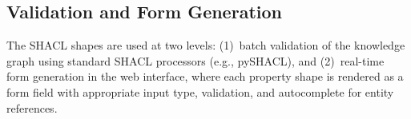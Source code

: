 \subsection{Validation and Form Generation}

The SHACL shapes are used at two levels: (1)~batch validation of the knowledge
graph using standard SHACL processors (e.g., pySHACL), and (2)~real-time
form generation in the web interface, where each property shape is rendered as
a form field with appropriate input type, validation, and autocomplete for
entity references.
